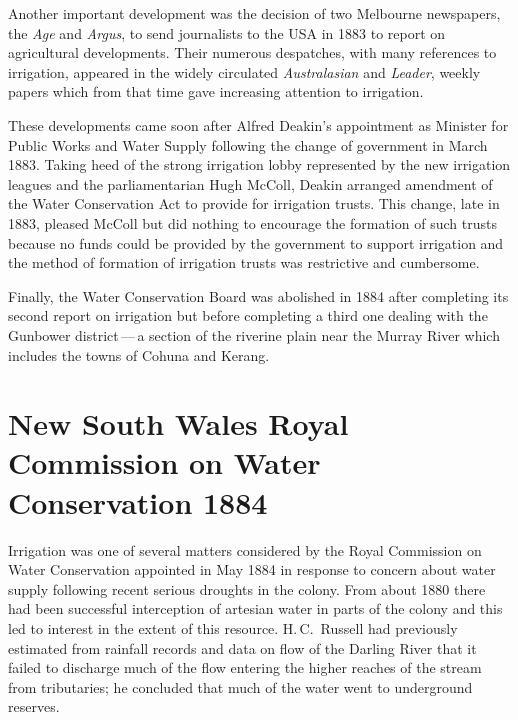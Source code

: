Another important development was the decision of two Melbourne
newspapers, the \textsl{Age} and \textsl{Argus}, to send journalists
to the USA  in 1883 to report on agricultural developments.
Their numerous despatches, with many references to irrigation,
appeared in the widely circulated \textsl{Australasian} and
\textsl{Leader}, weekly papers which from that time gave increasing
attention to irrigation.

These developments came soon after Alfred Deakin's 
appointment as Minister for Public Works and Water Supply following
the change of government in March 1883.  Taking heed of the strong
irrigation lobby represented by the new irrigation leagues and the
parliamentarian Hugh McColl,  Deakin arranged
amendment of the Water Conservation Act to provide for irrigation
trusts.  This change, late in 1883, pleased McColl but did nothing to
encourage the formation of such trusts because no funds could be
provided by the government to support irrigation and the method of
formation of irrigation trusts was restrictive and
cumbersome.

Finally, the Water Conservation Board was abolished in 1884 after
completing its second report on irrigation but before completing a
third one dealing with the Gunbower district\,---\,a section of the
riverine plain near the Murray River  which
includes the towns of Cohuna  and   Ke\-rang.

\section*{New South Wales Royal Commission on Water Conservation 1884}
\index{NSW RC Water Conserv.}

Irrigation was one of several matters considered by the Royal
Commission on Water Conservation appointed in May 1884 in response to
concern about water supply following recent serious droughts in the
colony.  From about 1880 there had been successful interception of
artesian water in parts of the colony and this led to interest in the
extent of this resource.  H.\,C.~Russell \index{Russell, H.\,C.} had
previously estimated from rainfall records and data on flow of the
Darling River \index{river!Darling} that it failed to discharge much
of the flow entering the higher reaches of the stream from
tributaries; he concluded that much of the water went to underground
reserves.

